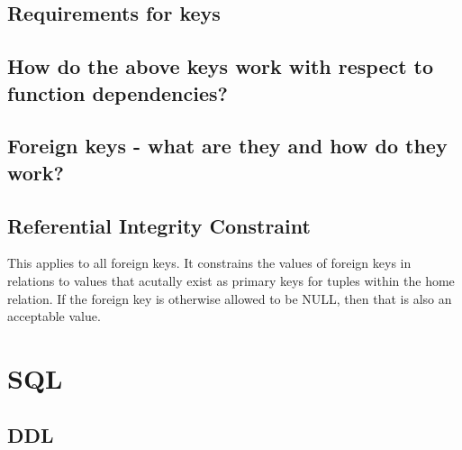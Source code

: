 \documentclass{report}
\begin{document}
\section{Requirements for keys}
\section{How do the above keys work with respect to function dependencies?}
\section{Foreign keys - what are they and how do they work?}
\section{Referential Integrity Constraint}
This applies to all foreign keys.
\bigbreak \noindent
It constrains the values of foreign keys in relations to values that acutally exist as primary keys for tuples within the home relation. 
\bigbreak \noindent
If the foreign key is otherwise allowed to be NULL, then that is also an acceptable value.
\chapter{SQL}
\section{DDL}
\end{document}
